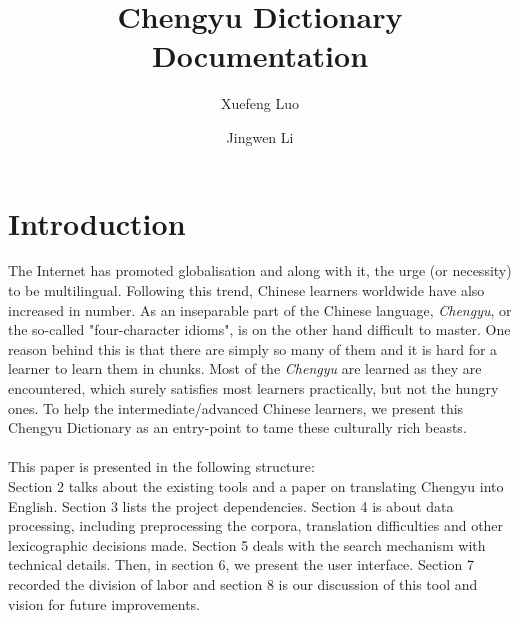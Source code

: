 \documentclass[11pt]{article} %
\title{Chengyu Dictionary Documentation} %
\author{Xuefeng Luo \and Jingwen Li}
\date{} %
\begin{document}
\maketitle

\section{Introduction}
\indent The Internet has promoted globalisation and along with it, the urge (or necessity) to be multilingual. Following this trend, Chinese learners worldwide have also increased in number. As an inseparable part of the Chinese language, \textit{Chengyu}, or the so-called "four-character idioms", is on the other hand difficult to master. One reason behind this is that there are simply so many of them and it is hard for a learner to learn them in chunks. Most of the \textit{Chengyu} are learned as they are encountered, which surely satisfies most learners practically, but not the hungry ones. To help the intermediate/advanced Chinese learners, we present this Chengyu Dictionary as an entry-point to tame these culturally rich beasts.\\
\\
\indent This paper is presented in the following structure:\\
Section 2 talks about the existing tools and a paper on translating Chengyu into English. Section 3 lists the project dependencies. Section 4 is about data processing, including preprocessing the corpora, translation difficulties and other lexicographic decisions made. Section 5 deals with the search mechanism with technical details. Then, in section 6, we present the user interface. Section 7 recorded the division of labor and section 8 is our discussion of this tool and vision for future improvements.
\end{document}
